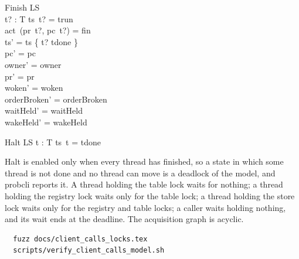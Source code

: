 \documentclass[a4paper,10pt,fleqn]{article}
\begin{document}
\begin{schema}{Finish}
  \Delta LS \\
  t? : T
\where
  ts~t? = trun \\
  act~(pr~t?, pc~t?) = fin \\
  ts' = ts \oplus \{ t? \mapsto tdone \} \\
  pc' = pc \\
  owner' = owner \\
  pr' = pr \\
  woken' = woken \\
  orderBroken' = orderBroken \\
  waitHeld' = waitHeld \\
  wakeHeld' = wakeHeld
\end{schema}

\begin{schema}{Halt}
  \Xi LS
\where
  \forall t : T \spot ts~t = tdone
\end{schema}

Halt is enabled only when every thread has finished, so a state in which some
thread is not done and no thread can move is a deadlock of the model, and
probcli reports it.  A thread holding the table lock waits for nothing; a
thread holding the registry lock waits only for the table lock; a thread
holding the store lock waits only for the registry and table locks; a caller
waits holding nothing, and its wait ends at the deadline.  The acquisition
graph is acyclic.

\begin{verbatim}
  fuzz docs/client_calls_locks.tex
  scripts/verify_client_calls_model.sh
\end{verbatim}
\end{document}

